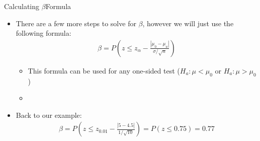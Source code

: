 \documentclass[xcolor=dvipsnames]{beamer}
\begin{document}
\begin{frame}{Calculating $\beta$}{Formula}
	\begin{itemize}
		\item There are a few more steps to solve for $\beta$, however we will just use the following formula:
		\begin{gather*}
			\beta = P\left(z \leq z_{\alpha} - \frac{|\mu_0 - \mu_a|}{\sigma / \sqrt{n}} \right)
		\end{gather*}
		\begin{itemize}
			\item This formula can be used for any one-sided test ($H_a: \mu < \mu_0$ or $H_a: \mu > \mu_0$)
			\item[]
		\end{itemize}
	\item Back to our example:
	\begin{align*}
	\beta = P\left(z \leq z_{0.01} - \frac{|5 - 4.5|}{1 / \sqrt{10}} \right) = P(z \leq 0.75) = 0.77
	\end{align*}
	\end{itemize}
\end{frame}
\end{document}
